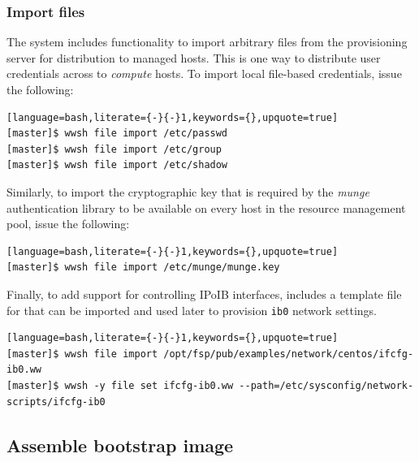 \documentclass[letterpaper]{article}
\begin{document}
\subsubsection{Import files} \label{sec:file_import}

The \Warewulf{} system includes functionality to import arbitrary files from the
provisioning server for distribution to managed hosts. This is one way
to distribute user credentials across to {\em compute} hosts. To
import local file-based credentials, issue the following:

\begin{lstlisting}[language=bash,literate={-}{-}1,keywords={},upquote=true]
[master]$ wwsh file import /etc/passwd                                                                                                       
[master]$ wwsh file import /etc/group
[master]$ wwsh file import /etc/shadow 
\end{lstlisting}

\newpage
Similarly, to import the cryptographic key that is required by the {\em munge}
authentication library to be available on every host in the resource management
pool, issue the following:

\begin{lstlisting}[language=bash,literate={-}{-}1,keywords={},upquote=true]
[master]$ wwsh file import /etc/munge/munge.key
\end{lstlisting}

Finally, to add support for controlling IPoIB interfaces, \FSP{} includes a
template file for \Warewulf{} that can be imported and used later to provision
\texttt{ib0} network settings.

\begin{lstlisting}[language=bash,literate={-}{-}1,keywords={},upquote=true]
[master]$ wwsh file import /opt/fsp/pub/examples/network/centos/ifcfg-ib0.ww
[master]$ wwsh -y file set ifcfg-ib0.ww --path=/etc/sysconfig/network-scripts/ifcfg-ib0
\end{lstlisting}


\subsection{Assemble bootstrap image}
\end{document}
